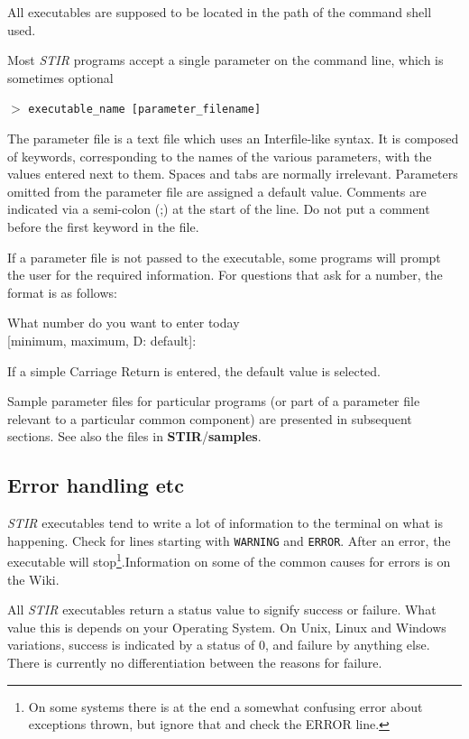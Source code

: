 \documentclass{article}
\newcommand{\tab}{\hspace{5mm}}
\newcommand{\cmdline}[1]{\par \noindent $>$ \texttt{#1}\par}
\begin{document}
All executables are supposed to be located in the path of the 
command shell used.


Most \textit{STIR} programs accept a single parameter on the command 
line, which is sometimes optional

\cmdline{executable\_name [parameter\_filename]}


The parameter file is a text file which uses an Interfile-like 
syntax. It is composed of keywords, corresponding to the names 
of the various parameters, with the values entered next to them. 
Spaces and tabs are normally irrelevant. Parameters omitted from 
the parameter file are assigned a default value. 
Comments are indicated via a semi-colon (;) at the start of the line. Do
not put a comment before the first keyword in the file.

If a parameter file is not passed to the executable, some
programs will prompt the user 
for the required information. For questions that 
ask for a number, the format is as follows:


\tab What number do you want to enter today \\
\tab [minimum, maximum, D: default]:


If a simple Carriage Return is entered, the default value is 
selected.


Sample parameter files for particular programs (or part of a 
parameter file relevant to a particular common component) are 
presented in subsequent sections. See also the files in \textbf{STIR}/\textbf{samples}.


\subsection{
Error handling etc}
\textit{STIR} executables tend to write a lot of information to the terminal on what is happening.
Check for lines starting with \texttt{WARNING} and \texttt{ERROR}. 
After an error, the executable will stop\footnote{On some systems there is at the end
a somewhat confusing error about
exceptions thrown, but ignore that and check the ERROR line.}.Information on some of the common
causes for errors is on the Wiki.

All \textit{STIR} executables return a status value to signify success 
or failure. What value this is depends on your Operating System. 
On Unix, Linux and Windows variations, success is indicated by 
a status of 0, and failure by anything else. There is currently 
no differentiation between the reasons for failure.
\end{document}
